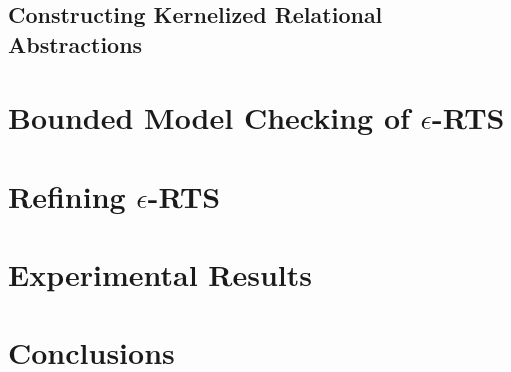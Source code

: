 \documentclass[9pt,sigconf]{acmart}
\begin{document}
\subsection{Constructing Kernelized Relational Abstractions}


\section{Bounded Model Checking of $\epsilon$-RTS}
\label{sec:bmc}


\section{Refining $\epsilon$-RTS}
\label{sec:rel-mod}







\section{Experimental Results}
\label{sec:res}



\section{Conclusions}
\label{sec:concl}





\clearpage
\appendix

\end{document}

